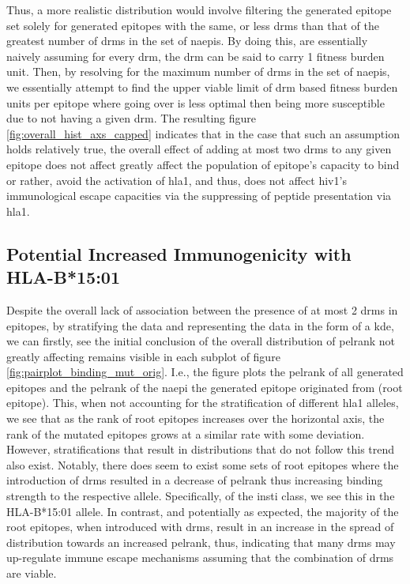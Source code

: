 Thus, a more realistic distribution would involve filtering the generated epitope set solely for generated epitopes with the same, or less \acp{drm} than that of the greatest number of \acp{drm} in the set of \acp{naepi}. By doing this, are essentially naively assuming for every \ac{drm}, the \ac{drm} can be said to carry 1 fitness burden unit. Then, by resolving for the maximum number of \acp{drm} in the set of \acp{naepi}, we essentially attempt to find the upper viable limit of \ac{drm} based fitness burden units per epitope where going over is less optimal then being more susceptible due to not having a given \ac{drm}. The resulting figure \ref{fig:overall_hist_axs_capped} indicates that in the case that such an assumption holds relatively true, the overall effect of adding at most two \acp{drm} to any given epitope does not affect greatly affect the population of epitope's capacity to bind or rather, avoid the activation of \ac{hla1}, and thus, does not affect \ac{hiv1}'s immunological escape capacities via the suppressing of peptide presentation via \ac{hla1}.

\subsection{Potential Increased Immunogenicity with HLA-B*15:01}

Despite the overall lack of association between the presence of at most 2 \acp{drm} in epitopes, by stratifying the data and representing the data in the form of a \ac{kde}, we can firstly, see the initial conclusion of the overall distribution of \ac{pelrank} not greatly affecting remains visible in each subplot of figure \ref{fig:pairplot_binding_mut_orig}. I.e., the figure plots the \ac{pelrank} of all generated epitopes and the \ac{pelrank} of the \ac{naepi} the generated epitope originated from (root epitope). This, when not accounting for the stratification of different \ac{hla1} alleles, we see that as the rank of root epitopes increases over the horizontal axis, the rank of the mutated epitopes grows at a similar rate with some deviation. However, stratifications that result in distributions that do not follow this trend also exist. Notably, there does seem to exist some sets of root epitopes where the introduction of \acp{drm} resulted in a decrease of \ac{pelrank} thus increasing binding strength to the respective allele. Specifically, of the \ac{insti} class, we see this in the HLA-B*15:01 allele. In contrast, and potentially as expected, the majority of the root epitopes, when introduced with \acp{drm}, result in an increase in the spread of distribution towards an increased \ac{pelrank}, thus, indicating that many \acp{drm} may up-regulate immune escape mechanisms assuming that the combination of \acp{drm} are viable.

